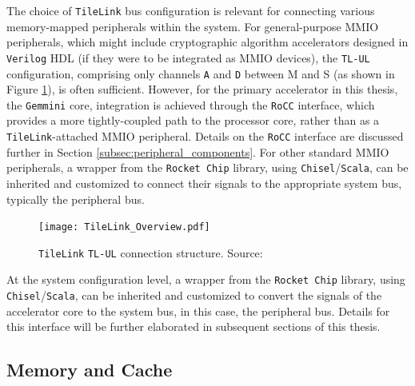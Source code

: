 
The choice of \texttt{TileLink} bus configuration is relevant for connecting various memory-mapped peripherals within the system. For general-purpose MMIO peripherals, which might include cryptographic algorithm accelerators designed in \texttt{Verilog} HDL (if they were to be integrated as MMIO devices), the \texttt{TL-UL} configuration, comprising only channels \texttt{A} and \texttt{D} between M and S (as shown in Figure \ref{fig:tilelink_tl_ul_structure}), is often sufficient. However, for the primary accelerator in this thesis, the \texttt{Gemmini} core, integration is achieved through the \texttt{RoCC} interface, which provides a more tightly-coupled path to the processor core, rather than as a \texttt{TileLink}-attached MMIO peripheral. Details on the \texttt{RoCC} interface are discussed further in Section \ref{subsec:peripheral_components}. For other standard MMIO peripherals, a wrapper from the \texttt{Rocket Chip} library, using \texttt{Chisel}/\texttt{Scala}, can be inherited and customized to connect their signals to the appropriate system bus, typically the peripheral bus.


\begin{figure}[h!]
    \centering
    \texttt{[image: TileLink\_Overview.pdf]} %
    \caption{\texttt{TileLink} \texttt{TL-UL} connection structure. Source: \cite{sifive2017tilelink}}
    \label{fig:tilelink_tl_ul_structure}
\end{figure}

At the system configuration level, a wrapper from the \texttt{Rocket Chip} library, using \texttt{Chisel}/\texttt{Scala}, can be inherited and customized to convert the signals of the accelerator core to the system bus, in this case, the peripheral bus. Details for this interface will be further elaborated in subsequent sections of this thesis.

\subsection{Memory and Cache}
\label{subsec:memory_cache}

